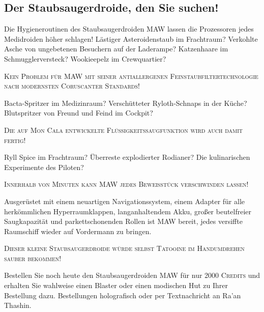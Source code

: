 \documentclass[final]{multiversum}
\begin{document}
\subsection{Der Staubsaugerdroide, den Sie suchen!}

Die Hygieneroutinen des Staubsaugerdroiden MAW lassen die Prozessoren jedes Medidroiden höher schlagen!
Lästiger Asteroidenstaub im Frachtraum?
Verkohlte Asche von ungebetenen Besuchern auf der Laderampe?
Katzenhaare im Schmugglerversteck? Wookieepelz im Crewquartier?\\
\begin{center}\textsc{Kein Problem für MAW mit seiner antiallergenen Feinstaubfiltertechnologie nach modernsten Coruscanter Standards!}\\\end{center}
Bacta-Spritzer im Medizinraum?
Verschütteter Ryloth-Schnaps in der Küche?
Blutspritzer von Freund und Feind im Cockpit?\\
\begin{center}\textsc{Die auf Mon Cala entwickelte Flüssigkeitssaugfunktion wird auch damit fertig!}\\\end{center}
Ryll Spice im Frachtraum?
Überreste explodierter Rodianer?
Die kulinarischen Experimente des Piloten?
\begin{center}\textsc{Innerhalb von Minuten kann MAW jedes Beweisstück verschwinden lassen!}\\\end{center}
Ausgerüstet mit einem neuartigen Navigationssystem, einem Adapter für alle herkömmlichen Hyperraumklappen, langanhaltendem Akku, großer beutelfreier Saugkapazität und parkettschonenden Rollen ist MAW bereit, jedes versiffte Raumschiff wieder auf Vordermann zu bringen.
\begin{center}\textsc{Dieser kleine Staubsaugerdroide würde selbst Tatooine im Handumdrehen sauber bekommen!}\\\end{center}
Bestellen Sie noch heute den Staubsaugerdroiden MAW für nur \textsc{2000 Credits} und erhalten Sie wahlweise einen Blaster oder einen modischen Hut zu Ihrer Bestellung dazu. 
Bestellungen holografisch oder per Textnachricht an Ra'an Thashin.\\
\end{document}
